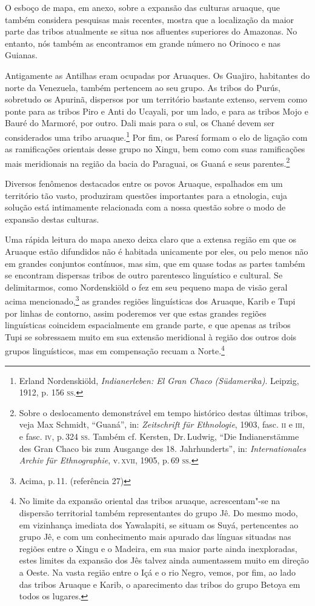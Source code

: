 O esboço de mapa, em anexo, sobre a expansão das culturas aruaque, que
também considera pesquisas mais recentes, mostra que a localização da
maior parte das tribos atualmente se situa nos afluentes
superiores do Amazonas. No entanto, nós também as encontramos em grande
número no Orinoco e nas Guianas. 

Antigamente as Antilhas eram ocupadas
por Aruaques. Os Guajiro, habitantes do norte da Venezuela, também
pertencem ao seu grupo. As tribos do Purús, sobretudo os Apurinã,
dispersos por um território bastante extenso, servem como ponte para as
tribos Piro e Anti do Ucayali, por um lado, e para as tribos Mojo e
Bauré do Marmoré, por outro. Dali mais para o sul, os Chané devem ser
considerados uma tribo aruaque.\footnote{Erland Nordenskiöld,
  \textit{Indianerleben: El Gran Chaco (Südamerika)}. Leipzig, 1912, p.
  156 \textsc{ss}.} Por fim, os Paresí formam o elo de ligação com as
ramificações orientais desse grupo no Xingu, bem como com suas
ramificações mais meridionais na região da bacia do Paraguai, os Guaná e
seus parentes.\footnote{Sobre o deslocamento demonstrável em tempo
  histórico destas últimas tribos, veja Max Schmidt, ``Guaná'', in:
  \textit{Zeitschrift für Ethnologie}, 1903, fasc. \textsc{ii} e \textsc{iii}, e fasc. \textsc{iv},
  p.\,324 \textsc{ss}. Também cf. Kersten, Dr.\,Ludwig, ``Die Indianerstämme des
  Gran Chaco bis zum Ausgange des 18. Jahrhunderts'', in:
  \textit{Internationales Archiv für Ethnographie}, v.\,\textsc{xvii}, 1905, p.\,69
  \textsc{ss}.}

Diversos fenômenos destacados entre os povos Aruaque, espalhados em um
território tão vasto, produziram questões importantes para a etnologia,
cuja solução está intimamente relacionada com a nossa questão sobre o
modo de expansão destas culturas.

Uma rápida leitura do mapa anexo deixa claro que a extensa região em
que os Aruaque estão difundidos não é habitada unicamente por eles, ou
pelo menos não em grandes conjuntos contínuos, mas sim, que em quase
todas as partes também se encontram dispersas tribos de outro
parentesco linguístico e cultural. Se delimitarmos, como Nordenskiöld o
fez em seu pequeno mapa de visão geral acima mencionado,\footnote{Acima,
  p.\,11. (referência 27)} as grandes regiões linguísticas dos Aruaque,
Karib e Tupi por linhas de contorno, assim poderemos ver que estas
grandes regiões linguísticas coincidem espacialmente em grande parte, e
que apenas as tribos Tupi se sobressaem muito em sua extensão meridional
à região dos outros dois grupos linguísticos, mas em compensação recuam
a Norte.\footnote{No limite da expansão oriental das tribos aruaque,
acrescentam"-se na dispersão territorial também representantes do grupo
Jê. Do mesmo modo, em vizinhança imediata dos Yawalapiti, se situam os Suyá,
pertencentes ao grupo Jê, e com um conhecimento mais apurado das línguas
situadas nas regiões entre o Xingu e o Madeira, em sua maior parte ainda
inexploradas, estes limites da expansão dos Jês talvez ainda aumentassem
muito em direção a Oeste. Na vasta região entre o Içá e o rio Negro,
vemos, por fim, ao lado das tribos Aruaque e Karib, o aparecimento das
tribos do grupo Betoya em todos os lugares.}

